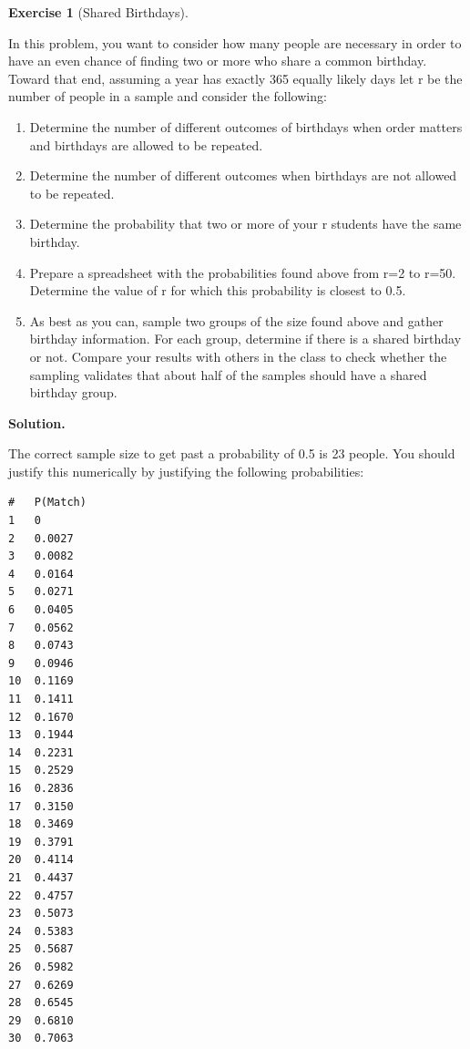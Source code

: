 \documentclass[10pt,]{book}
\theoremstyle{plain}
\theoremstyle{definition}
\theoremstyle{definition}
\theoremstyle{definition}
\newtheorem{exercise}[theorem]{Exercise}
\numberwithin{equation}{section}
\begin{document}
\begin{exercise}[{Shared Birthdays}]\label{exercise-26}

	In this problem, you want to consider how many people are necessary in order to have an even chance of finding two or more who share a common birthday. Toward that end, assuming a year has exactly 365 equally likely days let r be the number of people in a sample and consider the following:
	\leavevmode%
\begin{enumerate}
\item\hypertarget{li-153}{}Determine the number of different outcomes of birthdays when order matters and birthdays are allowed to be repeated.%
\item\hypertarget{li-154}{}Determine the number of different outcomes when birthdays are not allowed to be repeated.%
\item\hypertarget{li-155}{}Determine the probability that two or more of your r students have the same birthday.%
\item\hypertarget{li-156}{}Prepare a spreadsheet with the probabilities found above from r=2 to r=50. Determine the value of r for which this probability is closest to 0.5.%
\item\hypertarget{li-157}{}As best as you can, sample two groups of the size found above and gather birthday information. For each group, determine if there is a shared birthday or not.  Compare your results with others in the class to check whether the sampling validates that about half of the samples should have a shared birthday group.%
\end{enumerate}

\par\smallskip
\noindent\textbf{Solution.}\hypertarget{solution-5}{}\quad

	The correct sample size to get past a probability of 0.5 is 23 people. You should justify this numerically by justifying the following probabilities:
\begin{verbatim}
#	P(Match)	
1	0
2	0.0027
3	0.0082
4	0.0164
5	0.0271
6	0.0405
7	0.0562
8	0.0743
9	0.0946
10	0.1169
11	0.1411
12	0.1670
13	0.1944
14	0.2231
15	0.2529
16	0.2836
17	0.3150
18	0.3469
19	0.3791
20	0.4114
21	0.4437
22	0.4757
23	0.5073
24	0.5383
25	0.5687
26	0.5982
27	0.6269
28	0.6545
29	0.6810
30	0.7063
\end{verbatim}

\end{exercise}
\end{document}
